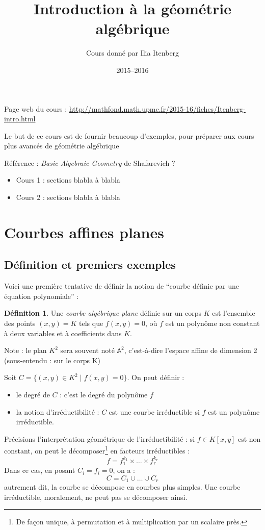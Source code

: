 \documentclass[a4paper, 11pt]{article}
\theoremstyle{definition}
\newtheorem{définition}{Définition}
\newcommand{\aff}{\mathbb{A}}
\begin{document}
\title{Introduction à la géométrie algébrique}
\author{Cours donné par Ilia Itenberg}
\date{2015--2016}

\maketitle

Page web du cours : \url{http://mathfond.math.upmc.fr/2015-16/fiches/Itenberg-intro.html}

Le but de ce cours est de fournir beaucoup d'exemples, pour préparer
aux cours plus avancés de géométrie algébrique

Référence : \textit{Basic Algebraic Geometry} de Shafarevich ?

\begin{itemize}
\item Cours 1 : sections blabla à blabla
\item Cours 2 : sections blabla à blabla
\end{itemize}

\tableofcontents

\newpage

\section{Courbes affines planes}

\subsection{Définition et premiers exemples}

Voici une première tentative de définir la notion de \enquote{courbe
  définie par une équation polynomiale} :
\begin{définition}
  Une \emph{courbe algébrique plane} définie sur un corps $K$ est
  l'ensemble des points $(x,y) = K$ tels que $f(x,y) = 0$, où $f$ est
  un polynôme non constant à deux variables et à coefficients dans
  $K$.
\end{définition}
Note : le plan $K^2$ sera souvent noté $\aff^2$, c'est-à-dire l'espace
affine de dimension 2 (sous-entendu : sur le corps K)

Soit $C = \{(x,y)\in K^2 \mid f(x,y)=0\}$. On peut définir :
\begin{itemize}
\item le degré de $C$ : c'est le degré du polynôme $f$
\item la notion d'irréductibilité : $C$ est une courbe irréductible si
  $f$ est un polynôme irréductible.
\end{itemize}
Précisions l'interprétation géométrique de l'irréductibilité : si
$f \in K[x,y]$ est non constant, on peut le décomposer\footnote{De
  façon unique, à permutation et à multiplication par un scalaire
  près.} en facteurs irréductibles :
\[ f = f_1^{k_1} \times \ldots \times f_r^{k_r} \]
Dans ce cas, en posant $C_i = {f_i = 0}$, on a :
\[ C = C_1 \cup \ldots \cup C_r \]
autrement dit, la courbe se décompose en courbes plus simples. Une
courbe irréductible, moralement, ne peut pas se décomposer ainsi.
\end{document}

